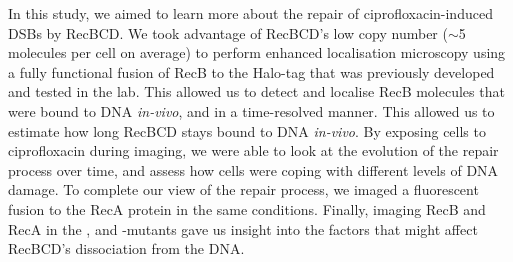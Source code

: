 In this study, we aimed to learn more about the repair of ciprofloxacin-induced DSBs by RecBCD. We took advantage of RecBCD's low copy number ($\sim$5 molecules per cell on average\cite{Lepore2019a}) to perform enhanced localisation microscopy\cite{Yu2006, Elf2007} using a fully functional fusion of RecB to the Halo-tag that was previously developed and tested in the lab\cite{Lepore2019a}. This allowed us to detect and localise RecB molecules that were bound to DNA \emph{in-vivo}, and in a time-resolved manner. This allowed us to estimate how long RecBCD stays bound to DNA \emph{in-vivo}. By exposing cells to ciprofloxacin during imaging, we were able to look at the evolution of the repair process over time, and assess how cells were coping with different levels of DNA damage. To complete our view of the repair process, we imaged a fluorescent fusion to the RecA protein in the same conditions. Finally, imaging RecB and RecA in the \dreca, \teneighty and \dreca-\teneighty mutants gave us insight into the factors that might affect RecBCD's dissociation from the DNA.

